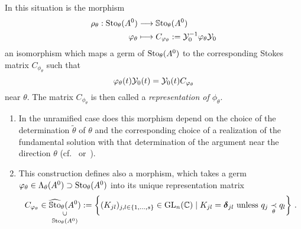 \begin{prop}\label{prop:representation}
  In this situation is the morphism
  \begin{align*}
    \rho_{\theta}:\operatorname{Sto}_\theta(A^0)&\longrightarrow\operatorname{\mathbb{S}to}_\theta(A^0)
    \\\varphi_\theta
    &\longmapsto
    C_{\varphi_\theta}:=\mathcal{Y}_{0}^{-1}\varphi_\theta\mathcal{Y}_{0}
  \end{align*}
  an isomorphism which maps a germ of $\operatorname{Sto}_\theta(A^0)$ to the corresponding
  Stokes matrix $C_{\phi_\theta}$ such that
  \begin{equation} \label{eq:representation}
    \varphi_\theta(t)\mathcal{Y}_{0}(t)
    =\mathcal{Y}_{0}(t)C_{\varphi_\theta}
  \end{equation}
  near $\theta$.
  The matrix $C_{\phi_\theta}$ is then called a \emph{representation of
  $\phi_\theta$}.
  \begin{s-rem}
    \begin{enumerate}
      \item In the unramified case does this morphism depend on the choice of
        the determination $\tilde\theta$ of $\theta$ and the corresponding
        choice of a realization of the fundamental solution with that
        determination of the argument near the direction $\theta$
        (cf.~\cite{Loday1994} or~\cite[78f]{Loday2014}).
      \item {}
        This construction defines also a morphism, which takes a germ
        $\varphi_\theta\in\Lambda_\theta(A^0)\supset\operatorname{Sto}_\theta(A^0)$ into its
        unique representation matrix
        \[
          C_{\phi_\theta} \in
          \underset{\SSto_\theta(A^0)}{%
            \underset{\text{\rotatebox[origin=c]{90}{$\subset$}}}{%
              \hat\SSto_{\theta}(A^0)}}
          :=
          \left\{(K_{jl})_{j,l\in\{1,\dots,s\}}
            \in \GL_n(\C)\mid K_{jl}=\bdelta_{jl} \text{ unless }
            q_j \underset{\theta}{\prec} q_l \right\}
          \,.
        \]
        \begin{comment}
          Does this define a local-constant sheaf
          \[
            I\mapsto \hat\SSto_{I}(A^0)
            :=
            \left\{(K_{jl})_{j,l\in\{1,\dots,s\}}
              \in \GL_n(\C)\mid K_{jl}=\bdelta_{jl} \text{ unless }
              q_j \underset{\theta}{\prec} q_l
              \text{ for some } \theta\in I\right\}
          \]
          and a skyscreaper sheaf
          \[
            I\mapsto \SSto_{I}(A^0) \,.
          \]
          \PROBLEM
        \end{comment}
    \end{enumerate}
  \end{s-rem}
\end{prop}

